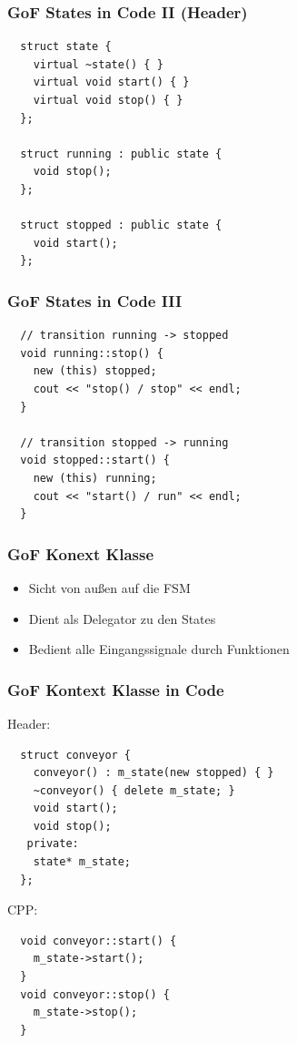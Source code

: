 \documentclass{beamer}
\begin{document}
\begin{frame}[fragile]
 \frametitle{GoF States in Code II (Header)}
 \begin{lstlisting}
  struct state {
    virtual ~state() { }
    virtual void start() { }
    virtual void stop() { }
  };

  struct running : public state {
    void stop();
  };

  struct stopped : public state {
    void start();
  };
 \end{lstlisting}
\end{frame}

\begin{frame}[fragile]
 \frametitle{GoF States in Code III}
 \begin{lstlisting}
  // transition running -> stopped
  void running::stop() {
    new (this) stopped;
    cout << "stop() / stop" << endl;
  }

  // transition stopped -> running
  void stopped::start() {
    new (this) running;
    cout << "start() / run" << endl;
  }
 \end{lstlisting}
\end{frame}


\begin{frame}
 \frametitle{GoF Konext Klasse}
 \begin{itemize}
  \item Sicht von au{\ss}en auf die FSM
  \item Dient als Delegator zu den States
  \item Bedient alle Eingangssignale durch Funktionen
 \end{itemize}
\end{frame}

\begin{frame}[fragile]
 \frametitle{GoF Kontext Klasse in Code}
 Header:
 \begin{lstlisting}
  struct conveyor {
    conveyor() : m_state(new stopped) { }
    ~conveyor() { delete m_state; }
    void start();
    void stop();
   private:
    state* m_state;
  };
 \end{lstlisting}
 CPP:
 \begin{lstlisting}
  void conveyor::start() {
    m_state->start();
  }
  void conveyor::stop() {
    m_state->stop();
  }
 \end{lstlisting}
\end{frame}
\end{document}
